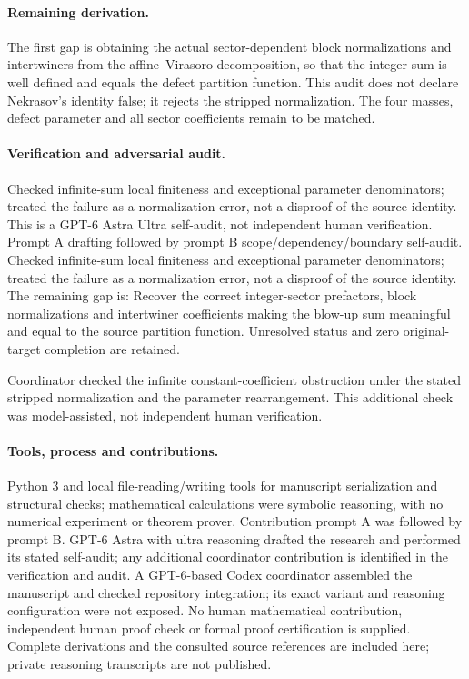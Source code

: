 \documentclass[11pt]{article}
\begin{document}
\paragraph{Remaining derivation.} The first gap is obtaining the actual sector-dependent block normalizations and intertwiners from the affine--Virasoro decomposition, so that the integer sum is well defined and equals the defect partition function. This audit does not declare Nekrasov's identity false; it rejects the stripped normalization. The four masses, defect parameter and all sector coefficients remain to be matched.

\paragraph{Verification and adversarial audit.}
Checked infinite-sum local finiteness and exceptional parameter denominators; treated the failure as a normalization error, not a disproof of the source identity. This is a GPT-6 Astra Ultra self-audit, not independent human verification. Prompt A drafting followed by prompt B scope/dependency/boundary self-audit. Checked infinite-sum local finiteness and exceptional parameter denominators; treated the failure as a normalization error, not a disproof of the source identity. The remaining gap is: Recover the correct integer-sector prefactors, block normalizations and intertwiner coefficients making the blow-up sum meaningful and equal to the source partition function. Unresolved status and zero original-target completion are retained.

Coordinator checked the infinite constant-coefficient obstruction under the stated stripped normalization and the parameter rearrangement. This additional check was model-assisted, not independent human verification.

\paragraph{Tools, process and contributions.}
Python 3 and local file-reading/writing tools for manuscript serialization and structural checks; mathematical calculations were symbolic reasoning, with no numerical experiment or theorem prover. Contribution prompt A was followed by prompt B. GPT-6 Astra with ultra reasoning drafted the research and performed its stated self-audit; any additional coordinator contribution is identified in the verification and audit. A GPT-6-based Codex coordinator assembled the manuscript and checked repository integration; its exact variant and reasoning configuration were not exposed. No human mathematical contribution, independent human proof check or formal proof certification is supplied. Complete derivations and the consulted source references are included here; private reasoning transcripts are not published.
\end{document}
